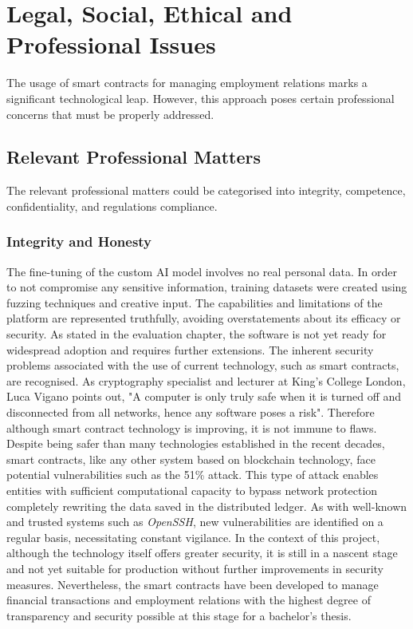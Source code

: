 \chapter{Legal, Social, Ethical and Professional Issues}

The usage of smart contracts for managing employment relations marks a significant technological leap. However, this approach poses certain professional concerns that must be properly addressed. 

\section{Relevant Professional Matters}

The relevant professional matters could be categorised into integrity, competence, confidentiality, and regulations compliance.

\subsection{Integrity and Honesty}

The fine-tuning of the custom AI model involves no real personal data. In order to not compromise any sensitive information, training datasets were created using fuzzing techniques and creative input. The capabilities and limitations of the platform are represented truthfully, avoiding overstatements about its efficacy or security. As stated in the evaluation chapter, the software is not yet ready for widespread adoption and requires further extensions. The inherent security problems associated with the use of current technology, such as smart contracts, are recognised. As cryptography specialist and lecturer at King's College London, Luca Vigano points out, "A computer is only truly safe when it is turned off and disconnected from all networks, hence any software poses a risk". Therefore although smart contract technology is improving, it is not immune to flaws. Despite being safer than many technologies established in the recent decades, smart contracts, like any other system based on blockchain technology, face potential vulnerabilities such as the 51\% attack. This type of attack enables entities with sufficient computational capacity to bypass network protection completely rewriting the data saved in the distributed ledger. As with well-known and trusted systems such as \textit{OpenSSH}, new vulnerabilities are identified on a regular basis, necessitating constant vigilance. In the context of this project, although the technology itself offers greater security, it is still in a nascent stage and not yet suitable for production without further improvements in security measures. Nevertheless, the smart contracts have been developed to manage financial transactions and employment relations with the highest degree of transparency and security possible at this stage for a bachelor's thesis.

